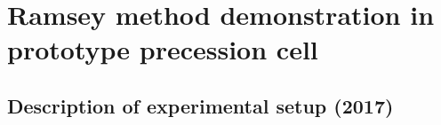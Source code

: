 
\chapter{Ramsey method demonstration in prototype precession cell}\label{chap:lanl_ramsey_demonstration}




\section{Description of experimental setup (2017)}



